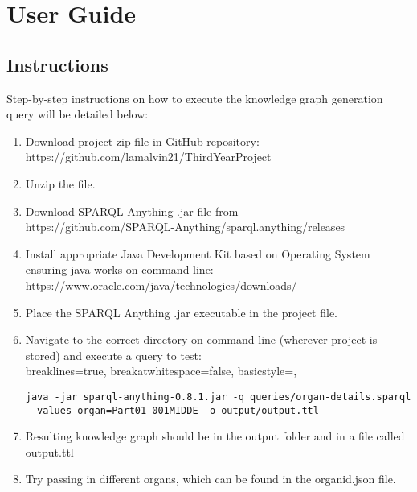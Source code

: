 \chapter{User Guide}
\section{Instructions}
Step-by-step instructions on how to execute the knowledge graph generation query will be detailed below:

\begin{enumerate}
    \item Download project zip file in GitHub repository: \\ https://github.com/lamalvin21/ThirdYearProject
    \item Unzip the file.
    \item Download SPARQL Anything .jar file from \\ https://github.com/SPARQL-Anything/sparql.anything/releases
    \item Install appropriate Java Development Kit based on Operating System ensuring java works on command line: \\ https://www.oracle.com/java/technologies/downloads/
    \item Place the SPARQL Anything .jar executable in the project file.
    \item Navigate to the correct directory on command line (wherever project is stored) and execute a query to test: \\ 
\vspace{-0.4cm}
\lstset
{
    breaklines=true,
    breakatwhitespace=false,
    basicstyle=\linespread{1}\ttfamily,
}
\begin{lstlisting}
java -jar sparql-anything-0.8.1.jar -q queries/organ-details.sparql --values organ=Part01_001MIDDE -o output/output.ttl
\end{lstlisting}
\vspace{-0.25cm}
    \item Resulting knowledge graph should be in the output folder and in a file called output.ttl
    \item Try passing in different organs, which can be found in the organid.json file.
\end{enumerate}

